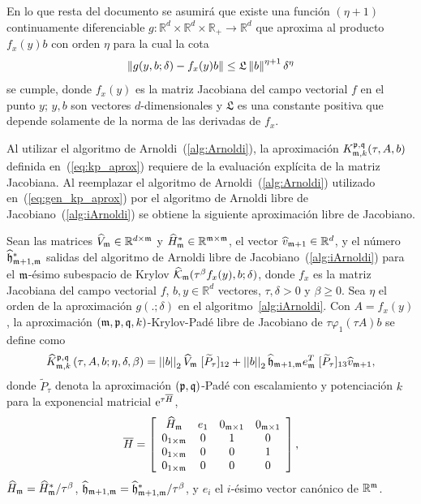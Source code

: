 En lo que resta del documento se asumirá que existe una función $(\eta+1)$ continuamente diferenciable $g: \mathbb{R}^{d}\times \mathbb{R}^{d} \times \mathbb{R}_+ \to \mathbb{R}^{d}$ que aproxima al producto $f_x(y)b$ con orden $\eta$ para la cual la cota
\begin{equation} \label{eq:g_bound}
	\left\lVert g(y,b;\delta)-f_x(y)b \right\rVert \leq \mathfrak{L}\left\lVert b \right\rVert^{\eta+1}\delta^{\eta}
\end{equation}
se cumple, donde $f_x(y)$ es la matriz Jacobiana del campo vectorial $f$ en el punto $y$; $y,b$ son vectores $d$-dimensionales y $\mathfrak{L}$ es una constante positiva que depende solamente de la norma de las derivadas de $f_x$.

Al utilizar el algoritmo de Arnoldi~(\ref{alg:Arnoldi}), la aproximación $K_{\mathfrak{m},k}^{\mathfrak{p},\mathfrak{q}}(\tau,A,b)$ definida en~(\ref{eq:kp_aprox}) requiere de la evaluación explícita de la matriz Jacobiana. Al reemplazar el algoritmo de Arnoldi~(\ref{alg:Arnoldi}) utilizado en~(\ref{eq:gen_kp_aprox}) por el algoritmo de Arnoldi libre de Jacobiano~(\ref{alg:iArnoldi}) se obtiene la siguiente aproximación libre de Jacobiano.

\begin{definition}\label{def:gen_kp_aprox_fj}
	Sean las matrices $\widehat{V}_{\mathfrak{m}}\in\mathbb{R}^{d\times \mathfrak{m}}$ y $\widehat{H}^*_{\mathfrak{m}}\in\mathbb{R}^{{\mathfrak{m}} \times {\mathfrak{m}}}$, el vector $\widehat{v}_{\mathfrak{m}+1}\in\mathbb{R}^d$, y el número  $ \widehat{\mathfrak{h}}^*_{\mathfrak{m}+1,\mathfrak{m}}$ salidas del algoritmo de Arnoldi libre de Jacobiano~(\ref{alg:iArnoldi}) para el $\mathfrak{m}$-ésimo subespacio de Krylov $\widehat{\mathcal{K}}_{\mathfrak{m}}(\tau^\beta f_x(y),b;\delta)$, donde $f_x$ es la matriz Jacobiana del campo vectorial $f$, $b,y\in\mathbb{R}^d$ vectores, $\tau,\delta>0$ y $\beta \ge 0$. Sea $\eta$ el orden de la aproximación $g(.;\delta)$ en el algoritmo~\ref{alg:iArnoldi}. Con $A=f_x(y)$, la aproximación $(\mathfrak{m} , \mathfrak{p} ,\mathfrak{q} , k)$-Krylov-Padé libre de Jacobiano de $\tau \varphi_1(\tau A)b$ se define como 
	\begin{equation} \label{eq:gen_kp_aprox_fj}
		\widehat{K}_{\mathfrak{m},k}^{\mathfrak{p},\mathfrak{q}}\left(\tau, A , b ; \eta, \delta, \beta \right)=\left\lvert \left\lvert b \right\rvert \right\rvert_2 \widehat{V}_{\mathfrak{m}}\;[\widetilde{P}_{\tau}]_{12} + \left\lvert \left\lvert b \right\rvert \right\rvert_2 \widehat{\mathfrak{h}}_{\mathfrak{m}+1,\mathfrak{m}}e_{\mathfrak{m}}^T\;[\widetilde{P}_{\tau}]_{13} \widehat{v}_{\mathfrak{m}+1},
	\end{equation}
	donde $\widetilde{P}_{\tau}$ denota la aproximación $(\mathfrak{p},\mathfrak{q})$-Padé con escalamiento y potenciación $k$ para la exponencial matricial $\mathrm{e}^{\tau\overline{H}}$, 
	\begin{equation}
		\overline{H} = \left[\begin{array}{cccc}
			\widehat{H}_{\mathfrak{m}} & e_1 & 0_{\mathfrak{m}\times 1} & 0_{\mathfrak{m}\times 1}\\
			0_{1\times\mathfrak{m}} & 0 & 1 & 0\\
			0_{1\times\mathfrak{m}} & 0 & 0 & 1\\
			0_{1\times\mathfrak{m}} & 0 & 0 & 0
		\end{array}\right],
	\end{equation}
	$\widehat{H}_{\mathfrak{m}}=\widehat{H}^*_{\mathfrak{m}}/\tau^\beta$, $\widehat{\mathfrak{h}}_{\mathfrak{m}+1,\mathfrak{m}}=\widehat{\mathfrak{h}}^*_{\mathfrak{m}+1,\mathfrak{m}}/\tau^\beta$, y $e_i$ el $i$-ésimo vector canónico de $\mathbb{R}^{\mathfrak{m}}$.
\end{definition}



